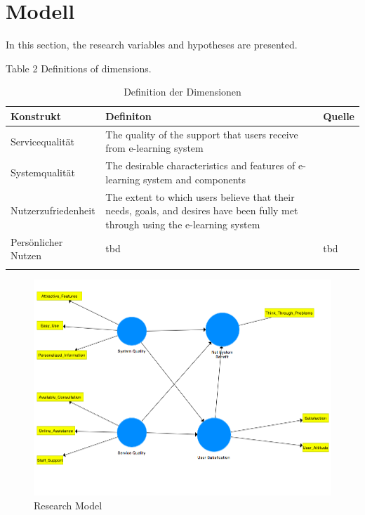 \section{Modell}
\label{sec:modell}

In this section, the research variables and hypotheses are presented.


Table 2
Definitions of dimensions.

\begin{table}[ht] 
\footnotesize
\caption{Definition der Dimensionen}
\label{tab:Dimensionen} 
\begin{tabular}{@{}lp{9cm}l@{}} \toprule

\textbf{Konstrukt} & \textbf{Definiton} & \textbf{Quelle} \\ \midrule

Servicequalität & The quality of the support that users receive from e-learning system & \parbox[t]{4cm}{\cite{petter2008measuring}}\\ 
Systemqualität & The desirable characteristics and features of e-learning system and components & \parbox[t]{4cm}{\cite{petter2008measuring}}\\ Nutzerzufriedenheit & The extent to which users believe that their needs, goals, and desires have been fully met through using the e-learning system & \parbox[t]{4cm}{\cite{sanchez2009moderating}}\\ 
Persönlicher Nutzen & \parbox[t]{9cm}{tbd}  & \parbox[t]{4cm}{tbd} \\ \addlinespace 
  \bottomrule

\end{tabular}	
\end{table}


\begin{figure}[h]
\centering
\includegraphics[width=1\textwidth]{Grafiken/Research_Model.png}
\caption{Research Model}
\label{Research Model}
\end{figure}